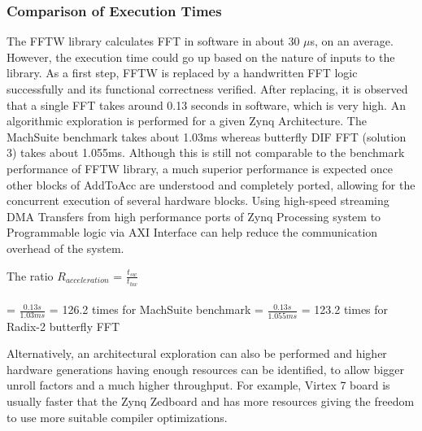 \subsubsection{Comparison of Execution Times}
The FFTW library calculates FFT in software in about 30 $\mu$s, on an average. However, the execution time could go up based on the nature of inputs to the library. As a first step, FFTW is replaced by a handwritten FFT logic successfully and its functional correctness verified. After replacing, it is observed that a single FFT takes around 0.13 seconds in software, which is very high. An algorithmic exploration is performed for a given Zynq Architecture. The MachSuite benchmark takes about 1.03ms whereas butterfly DIF FFT (solution 3) takes about 1.055ms. Although this is still not comparable to the benchmark performance of FFTW library, a much superior performance is expected once other blocks of AddToAcc are understood and completely ported, allowing for the concurrent execution of several hardware blocks. Using high-speed streaming DMA Transfers from high performance ports of Zynq Processing system to Programmable logic via AXI Interface can help reduce the communication overhead of the system. 
\begin{adjustwidth}{2cm}{}
The ratio $R_{acceleration}$ = $\frac{t_{sw}}{t_{hw}}$ \\ \\= $\frac{0.13 s}{1.03 ms}$ = 126.2 times for MachSuite benchmark\newline 
= $\frac{0.13 s}{1.055 ms}$ = 123.2 times for Radix-2 butterfly FFT\newline
\end{adjustwidth} 
Alternatively, an architectural exploration can also be performed and higher hardware generations having enough resources can be identified, to allow bigger unroll factors and a much higher throughput. For example, Virtex 7 board is usually faster that the Zynq Zedboard and has more resources giving the freedom to use more suitable compiler optimizations.